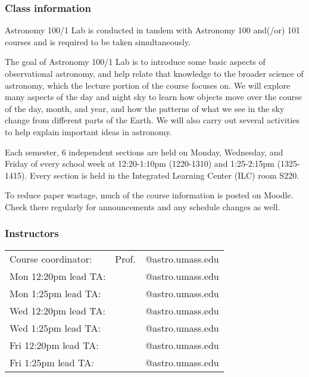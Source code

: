 \documentclass[main.tex]{subfiles}
\begin{document}
\subsubsection{Class information}
Astronomy 100/1 Lab is conducted in tandem with Astronomy 100 and(/or) 101 courses and is required to be taken simultaneously.

The goal of Astronomy 100/1 Lab is to introduce some basic aspects of observational astronomy, and help relate that knowledge to the broader science of astronomy, which the lecture portion of the course focuses on. We will explore many aspects of the day and night sky to learn how objects move over the course of the day, month, and year, and how the patterns of what we see in the sky change from different parts of the Earth. We will also carry out several activities to help explain important ideas in astronomy.

Each semester, 6 independent sections are held on Monday, Wednesday, and Friday of every school week at 12:20-1:10pm (1220-1310) and 1:25-2:15pm (1325-1415). Every section is held in the Integrated Learning Center (ILC) room S220.

To reduce paper wastage, much of the course information is posted on Moodle. Check there regularly for announcements and any schedule changes as well.

\subsubsection{Instructors}
\begin{table}[h!]
\begin{center}
\begin{tabular}{p{4.15cm}p{5cm}p{5cm}}
Course coordinator:& Prof. & @astro.umass.edu\\
Mon 12:20pm lead TA:&  & @astro.umass.edu\\
Mon 1:25pm lead TA:&  & @astro.umass.edu\\
Wed 12:20pm lead TA:&  & @astro.umass.edu\\
Wed 1:25pm lead TA:&  & @astro.umass.edu\\
Fri 12:20pm lead TA:&  & @astro.umass.edu\\
Fri 1:25pm lead TA:&  & @astro.umass.edu\\
\end{tabular}
\end{center}
\label{default}
\end{table}
\vspace{-20pt}
\end{document}
